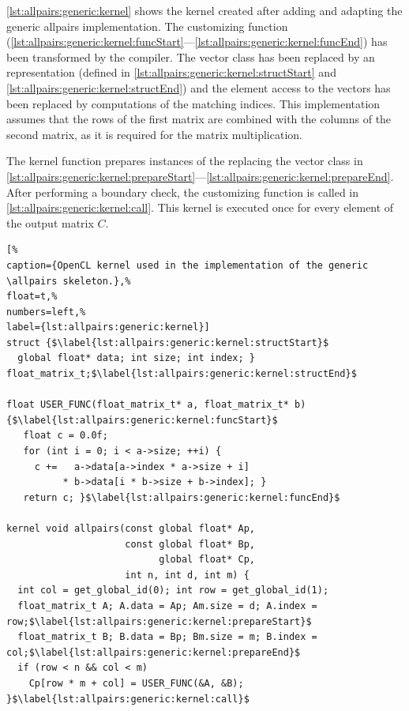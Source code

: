 \autoref{lst:allpairs:generic:kernel} shows the \OpenCL kernel created after adding and adapting the generic allpairs implementation.
The customizing function (\autoref{lst:allpairs:generic:kernel:funcStart}---\autoref{lst:allpairs:generic:kernel:funcEnd}) has been transformed by the  compiler.
The vector class has been replaced by an \OpenCL representation (defined in \autoref{lst:allpairs:generic:kernel:structStart} and \autoref{lst:allpairs:generic:kernel:structEnd}) and the element access to the vectors has been replaced by computations of the matching indices.
This implementation assumes that the rows of the first matrix are combined with the columns of the second matrix, as it is required for the matrix multiplication.

The  kernel function prepares instances of the  replacing the vector class in \autoref{lst:allpairs:generic:kernel:prepareStart}---\autoref{lst:allpairs:generic:kernel:prepareEnd}.
After performing a boundary check, the customizing function is called in \autoref{lst:allpairs:generic:kernel:call}.
This \OpenCL kernel is executed once for every element of the output matrix $C$.

\begin{lstlisting}[%
caption={OpenCL kernel used in the implementation of the generic \allpairs skeleton.},%
float=t,%
numbers=left,%
label={lst:allpairs:generic:kernel}]
struct {$\label{lst:allpairs:generic:kernel:structStart}$
  global float* data; int size; int index; } float_matrix_t;$\label{lst:allpairs:generic:kernel:structEnd}$

float USER_FUNC(float_matrix_t* a, float_matrix_t* b) {$\label{lst:allpairs:generic:kernel:funcStart}$
   float c = 0.0f;
   for (int i = 0; i < a->size; ++i) {
     c +=   a->data[a->index * a->size + i]
          * b->data[i * b->size + b->index]; }
   return c; }$\label{lst:allpairs:generic:kernel:funcEnd}$

kernel void allpairs(const global float* Ap,
                     const global float* Bp,
                           global float* Cp,
                     int n, int d, int m) {
  int col = get_global_id(0); int row = get_global_id(1);
  float_matrix_t A; A.data = Ap; Am.size = d; A.index = row;$\label{lst:allpairs:generic:kernel:prepareStart}$
  float_matrix_t B; B.data = Bp; Bm.size = m; B.index = col;$\label{lst:allpairs:generic:kernel:prepareEnd}$
  if (row < n && col < m)
    Cp[row * m + col] = USER_FUNC(&A, &B); }$\label{lst:allpairs:generic:kernel:call}$
\end{lstlisting}

